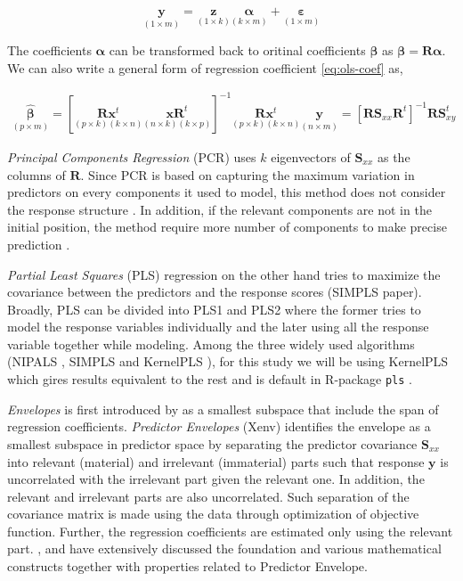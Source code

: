 \documentclass[12pt,3p,authoryear]{elsarticle}
\begin{document}
\begin{equation}
\underset{(1 \times m)}{\mathbf{y}} =
  \underset{(1 \times k)}{\mathbf{z}}
    \underset{(k \times m)}{\boldsymbol{\alpha}} +
  \underset{(1 \times m)}{\boldsymbol{\varepsilon}}
\label{eq:latent-model}
\end{equation}

The coefficients \(\boldsymbol{\alpha}\) can be transformed back to
oritinal coefficients \(\boldsymbol{\beta}\) as
\(\boldsymbol{\beta} = \mathbf{R} \boldsymbol{\alpha}\). We can also
write a general form of regression coefficient \eqref{eq:ols-coef} as,

\[
\begin{aligned}
\underset{(p\times m)}{\boldsymbol{\hat{\beta}}} =
  \left[
    \underset{(p\times k)(k \times n)}{\mathbf{R}\mathbf{x}^t}
    \underset{(n\times k)(k \times p)}{\mathbf{x} \mathbf{R}^t}
  \right]^{-1}
  \underset{(p\times k)(k \times n)}{\mathbf{R}\mathbf{x}^t}
  \underset{(n\times m)}{\mathbf{y}} =
  \left[\mathbf{RS}_{xx}\mathbf{R}^t\right]^{-1}\mathbf{RS}_{xy}^t
\end{aligned}
\]

\emph{Principal Components Regression} (PCR) uses \(k\) eigenvectors of
\(\mathbf{S}_{xx}\) as the columns of \(\mathbf{R}\). Since PCR is based
on capturing the maximum variation in predictors on every components it
used to model, this method does not consider the response structure
\citep{Jolliffe2002}. In addition, if the relevant components are not in
the initial position, the method require more number of components to
make precise prediction \citep{rimal2019pred}.

\emph{Partial Least Squares} (PLS) regression on the other hand tries to
maximize the covariance between the predictors and the response scores
(SIMPLS paper). Broadly, PLS can be divided into PLS1 and PLS2 where the
former tries to model the response variables individually and the later
using all the response variable together while modeling. Among the three
widely used algorithms (NIPALS \citep{wold75nipals}, SIMPLS
\citep{DeJong1993} and KernelPLS \citep{Lindgren_1993}), for this study
we will be using KernelPLS which gires results equivalent to the rest
and is default in R-package \texttt{pls} \citep{mevik07_thepl}.

\emph{Envelopes} is first introduced by \citep{Cook2007a} as a smallest
subspace that include the span of regression coefficients.
\emph{Predictor Envelopes} (Xenv) identifies the envelope as a smallest
subspace in predictor space by separating the predictor covariance
\(\mathbf{S}_{xx}\) into relevant (material) and irrelevant (immaterial)
parts such that response \(\mathbf{y}\) is uncorrelated with the
irrelevant part given the relevant one. In addition, the relevant and
irrelevant parts are also uncorrelated. Such separation of the
covariance matrix is made using the data through optimization of
objective function. Further, the regression coefficients are estimated
only using the relevant part. \citet{cook2010envelope},
\citet{cook2013envelopes} and \citet{cook2018envelope} have extensively
discussed the foundation and various mathematical constructs together
with properties related to Predictor Envelope.
\end{document}
